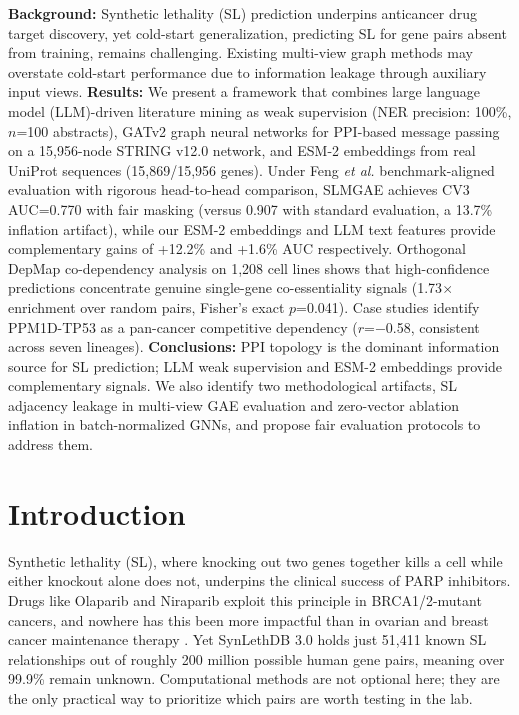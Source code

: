 \documentclass[12pt,a4paper]{article}
\begin{document}
\textbf{Background:} Synthetic lethality (SL) prediction underpins anticancer drug target discovery, yet cold-start generalization, predicting SL for gene pairs absent from training, remains challenging. Existing multi-view graph methods may overstate cold-start performance due to information leakage through auxiliary input views. \textbf{Results:} We present a framework that combines large language model (LLM)-driven literature mining as weak supervision (NER precision: 100\%, $n$=100 abstracts), GATv2 graph neural networks for PPI-based message passing on a 15,956-node STRING v12.0 network, and ESM-2 embeddings from real UniProt sequences (15,869/15,956 genes). Under Feng \textit{et al.} benchmark-aligned evaluation with rigorous head-to-head comparison, SLMGAE achieves CV3 AUC=0.770 with fair masking (versus 0.907 with standard evaluation, a 13.7\% inflation artifact), while our ESM-2 embeddings and LLM text features provide complementary gains of +12.2\% and +1.6\% AUC respectively. Orthogonal DepMap co-dependency analysis on 1,208 cell lines shows that high-confidence predictions concentrate genuine single-gene co-essentiality signals (1.73$\times$ enrichment over random pairs, Fisher's exact $p$=0.041). Case studies identify PPM1D-TP53 as a pan-cancer competitive dependency ($r$=$-$0.58, consistent across seven lineages). \textbf{Conclusions:} PPI topology is the dominant information source for SL prediction; LLM weak supervision and ESM-2 embeddings provide complementary signals. We also identify two methodological artifacts, SL adjacency leakage in multi-view GAE evaluation and zero-vector ablation inflation in batch-normalized GNNs, and propose fair evaluation protocols to address them.

\section{Introduction}

Synthetic lethality (SL), where knocking out two genes together kills a cell while either knockout alone does not, underpins the clinical success of PARP inhibitors. Drugs like Olaparib and Niraparib exploit this principle in BRCA1/2-mutant cancers, and nowhere has this been more impactful than in ovarian and breast cancer maintenance therapy \cite{bryant2005,farmar2005}. Yet SynLethDB 3.0 holds just 51,411 known SL relationships \cite{synlethdb3} out of roughly 200 million possible human gene pairs, meaning over 99.9\% remain unknown. Computational methods are not optional here; they are the only practical way to prioritize which pairs are worth testing in the lab.
\end{document}
